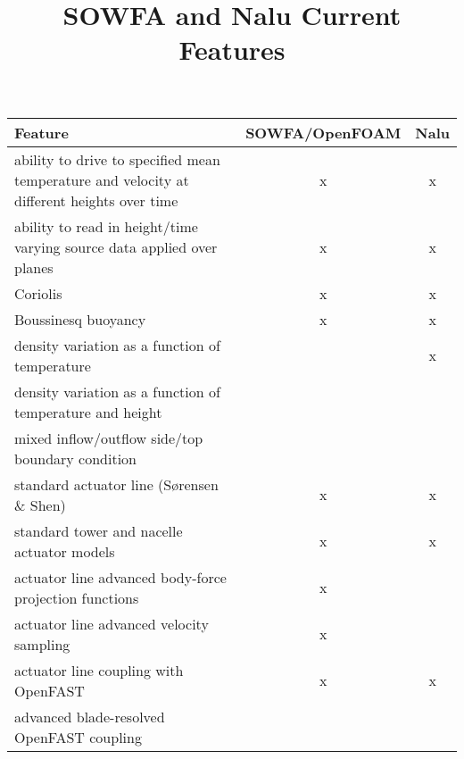 \documentclass{article}
\begin{document}
\title{SOWFA and Nalu Current Features}
\maketitle



\begin{center}
\begin{tabular}{ l | c | c }
\toprule
\textbf{Feature} & \textbf{SOWFA/OpenFOAM} & \textbf{Nalu} \\

\midrule
ability to drive to specified mean temperature and velocity at different heights over time & x & x \\
ability to read in height/time varying source data applied over planes & x & x \\
Coriolis & x & x \\
Boussinesq buoyancy & x & x \\
density variation as a function of temperature &   & x \\
density variation as a function of temperature and height &  &  \\
mixed inflow/outflow side/top boundary condition &  &  \\

\midrule
standard actuator line (S{\o}rensen \& Shen) & x  & x \\
standard tower and nacelle actuator models & x & x \\
actuator line advanced body-force projection functions & x &  \\
actuator line advanced velocity sampling & x  &  \\
actuator line coupling with OpenFAST & x & x \\
advanced blade-resolved OpenFAST coupling &  &  \\





\end{tabular}
\end{center}
\end{document}
